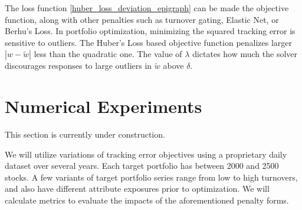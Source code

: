 \documentclass[11pt, letterpaper]{article}
\begin{document}
The loss function \eqref{huber_loss_deviation_epigraph} can be made the objective function, along with other penalties such as
turnover gating, Elastic Net, or Berhu's Loss. In portfolio optimization, minimizing the squared tracking error is sensitive to
outliers. The Huber's Loss based objective function penalizes larger $|w - \tilde{w}|$ less than the quadratic one. The value of $\lambda$ dictates how
much the solver discourages responses to large outliers in $\tilde{w}$ above $\delta$.

\section{Numerical Experiments}
This section is currently under construction.

We will utilize variations of tracking error objectives using a proprietary daily dataset over several years. Each target
portfolio has between 2000 and 2500 stocks. A few variants of target portfolio series range from low to high turnovers, and also
have different attribute exposures prior to optimization. We will calculate metrics to evaluate the impacts of the
aforementioned penalty forms.


\newpage

\nocite{*}

\end{document}
